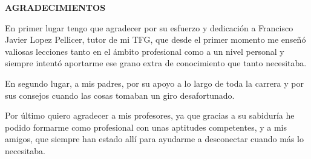 \begin{center}
{\Large \bfseries AGRADECIMIENTOS}
\vspace{2.5cm}
\end{center}

\par
En primer lugar tengo que agradecer por su esfuerzo y dedicación a Francisco Javier Lopez Pellicer, tutor de mi TFG, que desde el primer momento me enseñó valiosas lecciones tanto en el ámbito profesional como a un nivel personal y siempre intentó aportarme ese grano extra de conocimiento que tanto necesitaba.

\bigskip
\bigskip
\par
En segundo lugar, a mis padres, por su apoyo a lo largo de toda la carrera y por sus consejos cuando las cosas tomaban un giro desafortunado. 


\bigskip
\bigskip
\par 
Por último quiero agradecer a mis profesores, ya que gracias a su sabiduría he podido formarme como profesional con unas aptitudes competentes, y a mis amigos, que siempre han estado allí para ayudarme a desconectar cuando más lo necesitaba. 

\newpage